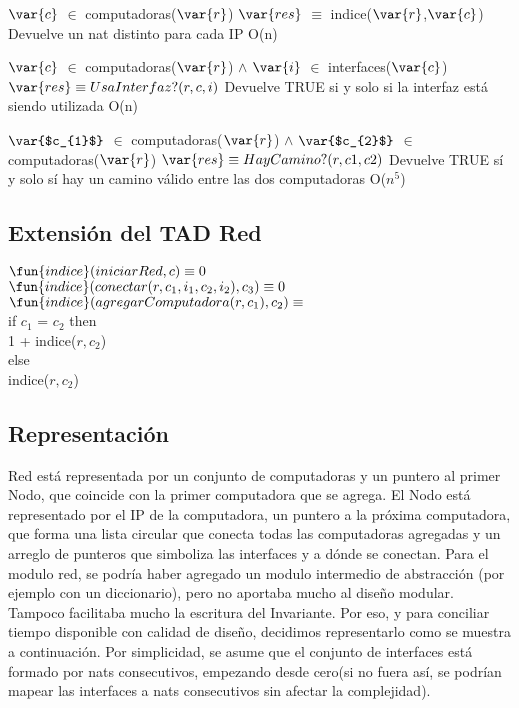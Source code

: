  {$\var{c}$ $\in$ computadoras($\var{r}$)}
 {$\var{res}$ $\equiv$ indice($\var{r}$,$\var{c}$)}
 {Devuelve un nat distinto para cada IP}
 {O(n)}

 {$\var{c}$ $\in$ computadoras($\var{r}$) $\land$ $\var{i}$ $\in$ interfaces($\var{c}$)}
 {$\var{res} \equiv UsaInterfaz?(r,c,i)$}
 {Devuelve TRUE si y solo si la interfaz está siendo utilizada}
 {O(n)}

 {$\var{$c_{1}$}$ $\in$ computadoras($\var{r}$) $\land$ $\var{$c_{2}$}$ $\in$ computadoras($\var{r}$)}
 {$\var{res} \equiv HayCamino?(r,c1,c2)$}
 {Devuelve TRUE sí y solo sí hay un camino válido entre las dos computadoras}
 {O($n^5$)}

\subsection{Extensión del TAD Red}
$\fun{indice}(iniciarRed, c) \equiv 0$ \\
$\fun{indice}(conectar(r,c_{1},i_{1},c_{2},i_{2}), c_{3}) \equiv 0$ \\
$\fun{indice}(agregarComputadora(r,c_{1}), c_{2}) \equiv$ 
	\\ if $c_{1}$ = $c_{2}$ then \\ 1 + indice($r,c_{2}$) \\ else \\ indice($r,c_{2}$)


\subsection{Representación}
Red está representada por un conjunto de computadoras y un puntero al primer Nodo, que coincide con la primer computadora que se agrega. El Nodo está representado por el IP de la computadora, un puntero a la próxima computadora, que forma una lista circular que conecta todas las computadoras agregadas y un arreglo de punteros que simboliza las interfaces y a dónde se conectan.
Para el modulo red, se podría haber agregado un modulo intermedio de abstracción (por ejemplo con un diccionario), pero no aportaba mucho al diseño modular. Tampoco facilitaba mucho la escritura del Invariante. Por eso, y para conciliar tiempo disponible con calidad de diseño, decidimos representarlo como se muestra a continuación. Por simplicidad, se asume que el conjunto de interfaces está formado por nats consecutivos, empezando desde cero(si no fuera así, se podrían mapear las interfaces a nats consecutivos sin afectar la complejidad).

